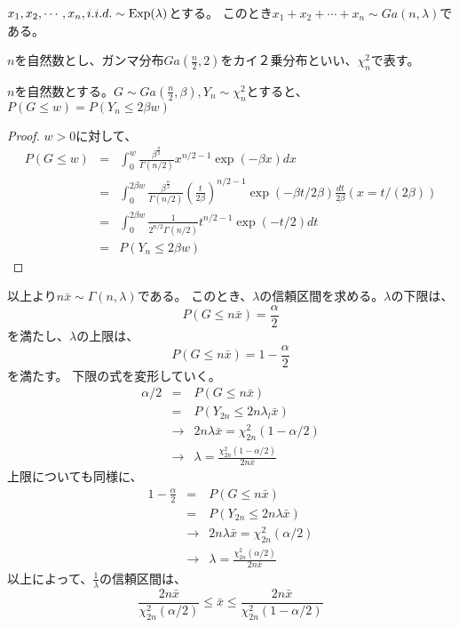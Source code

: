 \begin{theo}
    $x_1,x_2,\cdots,x_n,i.i.d. \sim \rm{Exp}(\lambda)$とする。
    このとき$x_1+x_2+\cdots+x_n \sim Ga(n,\lambda)$である。
\end{theo}

$n$を自然数とし、ガンマ分布$Ga(\frac{n}{2},2)$をカイ２乗分布といい、$\chi ^2_n$で表す。

\begin{theo}
$n$を自然数とする。$G\sim Ga(\frac{n}{2},\beta),Y_n\sim \chi^2_n$とすると、$P(G\leq w) = P(Y_n \leq 2\beta w)$
\end{theo}
\begin{proof}
$w >0$に対して、
\begin{eqnarray*}
    P(G \leq w) &=& \int_0^w \frac{\beta^\frac{n}{2}}{\Gamma(n/2)}x^{n/2-1}\exp{(-\beta x)}dx \\
    &=&\int_0^{2\beta w} \frac{\beta^{\frac{n}{2}}}{\Gamma(n/2)}\left( \frac{t}{2\beta} \right)^{n/2-1}\exp{(-\beta t/2\beta)}\frac{dt}{2\beta} (x=t/(2\beta)) \\
    &=& \int_0^{2\beta w} \frac{1}{2^{n/2}\Gamma(n/2)}t^{n/2-1}\exp{(-t/2)}dt\\
    &=&P(Y_n \leq 2\beta w)
\end{eqnarray*}
\end{proof}

以上より$n\bar{x}\sim \Gamma(n,\lambda)$である。
このとき、$\lambda$の信頼区間を求める。$\lambda$の下限は、
\begin{equation}
    P(G\leq n\bar{x}) = \frac{\alpha}{2}
\end{equation}
を満たし、$\lambda$の上限は、
\begin{equation}
P(G\leq n\bar{x}) = 1-\frac{\alpha}{2}
\end{equation}
を満たす。
下限の式を変形していく。
\begin{eqnarray*}
    \alpha/2 &=& P(G\leq n\bar{x})  \\
    &=& P(Y_{2n}\leq 2n \lambda_l \bar{x})\\
    &\rightarrow& 2n\lambda \bar{x} = \chi^2_{2n}(1-\alpha/2)\\
    &\rightarrow& \lambda = \frac{\chi^2_{2n}(1-\alpha/2)}{2n\bar{x}}
\end{eqnarray*}
上限についても同様に、
\begin{eqnarray*}
    1-\frac{\alpha}{2} &= & P(G\leq n\bar{x}) \\
    &=& P(Y_{2n}\leq 2n\lambda \bar{x})  \\
    &\rightarrow& 2n\lambda \bar{x} = \chi^2_{2n}(\alpha/2)\\
    &\rightarrow&  \lambda = \frac{\chi^2_{2n}(\alpha/2)}{2n\bar{x}}
\end{eqnarray*}
以上によって、$\frac{1}{\lambda}$の信頼区間は、
\begin{equation}
    \label{exp_model_confidence_interval}
    \frac{2n\bar{x}}{\chi^2_{2n}(\alpha/2)} \leq \bar{x} \leq \frac{2n\bar{x}}{\chi^2_{2n}(1-\alpha/2)}
\end{equation}




